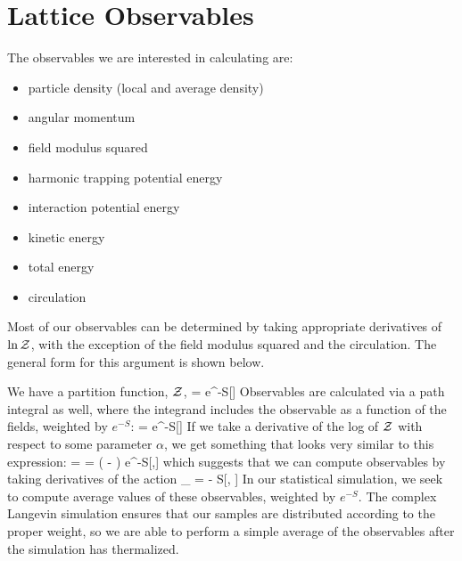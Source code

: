 \documentclass[../../RotatingBosons.tex]{subfiles}
\begin{document}

\section{\label{NRRBObservables}Lattice Observables}
The observables we are interested in calculating are:
\begin{itemize}
	\item particle density (local and average density)
	\item angular momentum
	\item field modulus squared
	\item harmonic trapping potential energy
	\item interaction potential energy
	\item kinetic energy
	\item total energy
	\item circulation
\end{itemize}
Most of our observables can be determined by taking appropriate derivatives of $\ln {\mathcal Z}$, with the exception of the field modulus squared and the circulation. The general form for this argument is shown below. 

We have a partition function, ${\mathcal Z}$, %
%
%
%
%
\beq
\CZ = \int \CD \phi e^{-S[\phi]}
\eeq
%
Observables are calculated via a path integral as well, where the integrand includes the observable as a function of the fields, weighted by $e^{-S}$:
%
\beq
\langle \CO \rangle = \int \CD \phi \CO[\phi]e^{-S[\phi]}
\eeq
%
If we take a derivative of the log of ${\mathcal Z}$ with respect to some parameter $\alpha$, we get something that looks very similar to this expression:
%
\beq
\frac{\partial \ln \CZ}{\partial \alpha} = \frac{\partial \CZ}{\partial \alpha} = \int \CD \phi ( - ) e^{-S[\phi,\alpha]}
\eeq
%
which suggests that we can compute observables by taking derivatives of the action
%
\beq
\hat{\CO}_{\alpha} = - \frac{\partial}{\partial \alpha} S[\phi, \alpha]
\eeq
%
In our statistical simulation, we seek to compute average values of these observables, weighted by $e^{-S}$. The complex Langevin simulation ensures that our samples are distributed according to the proper weight, so we are able to perform a simple average of the observables after the simulation has thermalized.
\end{document}
